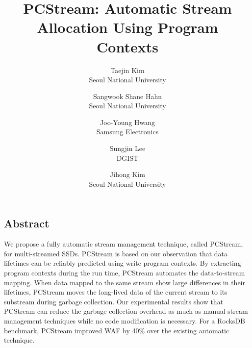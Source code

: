 \documentclass[letterpaper, twocolumn, 10pt]{article}
\begin{document}
\title{
\bf PCStream: Automatic Stream Allocation Using Program Contexts}


\author{
{\rm Taejin Kim}\\
Seoul National University
\and 
{\rm Sangwook Shane Hahn}\\
Seoul National University
\and 
{\rm Joo-Young Hwang} \\
Samsung Electronics
\and 
{\rm Sungjin Lee}\\
DGIST
\and 
{\rm Jihong Kim} \\
Seoul National University
}

\maketitle

\thispagestyle{empty}

\subsection*{Abstract}
We propose a fully automatic stream management technique, called {\sf PCStream}, 
for multi-streamed SSDs.
{\sf PCStream} is based on our observation that data lifetimes can be reliably predicted using
write program contexts.  
By extracting program contexts during the run time,  
{\sf PCStream}  automates the data-to-stream mapping.  
When data mapped to the same
stream show large differences in their lifetimes, {\sf PCStream}
moves the long-lived data of the current stream to 
its substream during garbage collection.
Our experimental results show that {\sf PCStream} can reduce the
garbage collection overhead as much as manual stream
management techniques while no code modification is necessary.
For a RocksDB benchmark, {\sf PCStream} improved WAF by 40\% over 
the existing automatic technique.








\end{document}
